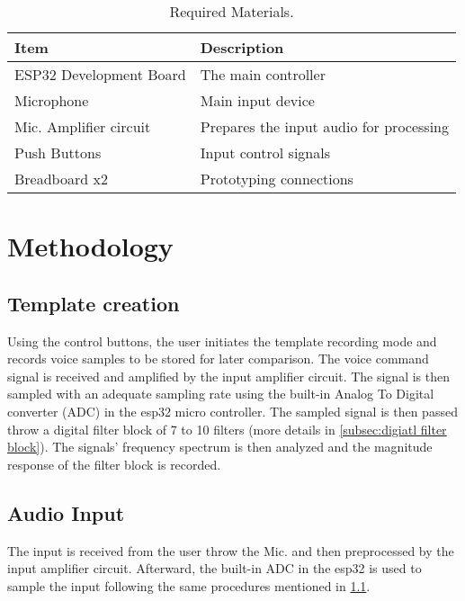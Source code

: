 \documentclass{article}
\begin{document}

	\begin{table}[h!]
		\caption{Required Materials.}
		\label{tabletest}
		\begin{center}
  			\begin{tabularx}{\textwidth}{ X X }
    				\toprule
    				Item & Description \\ 
    				\midrule
    				ESP32 Development Board & The main controller \\ 
    				
    				Microphone  & Main input device \\ 
    				
    				Mic. Amplifier circuit & Prepares the input audio for processing \\ 
    				
    				Push Buttons & Input control signals \\
    				
    				Breadboard x2 & Prototyping connections\\
    				
    				\bottomrule
  			\end{tabularx}
		\end{center}
	\end{table}
	
	
	
	\section{Methodology}
	
	\subsection{Template creation}
	\label{subsec:template creation}
	Using the control buttons, the user initiates the template recording mode and records voice samples to be stored for later comparison. The voice command signal is received and amplified by the input amplifier circuit. The signal is then sampled with an adequate sampling rate using the built-in Analog To Digital converter (ADC) in the esp32 micro controller. The sampled signal is then passed throw a digital filter block of 7 to 10 filters (more details in \ref{subsec:digiatl filter block}). The signals' frequency spectrum is then analyzed and the magnitude response of the filter block is recorded.  
	
	\subsection{Audio Input}
	\label{subsec:audio input}
	The input is received from the user throw the Mic. and then preprocessed by the input amplifier circuit. Afterward, the built-in ADC in the esp32 is used to sample the input following the same procedures mentioned in \ref{subsec:template creation}. 
	
\end{document}
